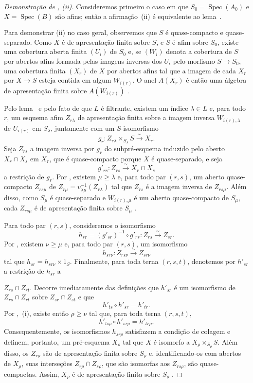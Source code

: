 \begin{proof}[Demonstração de , (ii)]
Consideremos primeiro o caso em que $S_0=\operatorname{Spec}(A_0)$ e $X=\operatorname{Spec}(B)$ são afins; então a afirmação~(ii) é equivalente ao lema~.

Para demonstrar (ii) no caso geral, observemos que $S$ é quase-compacto e quase-separado. Como $X$ é de apresentação finita sobre $S$, e $S$ é afim sobre $S_0$, existe uma cobertura aberta finita $(U_i)$ de $S_0$ e, se $(W_i)$ denota a cobertura de $S$ por abertos afins formada pelas imagens inversas dos $U_i$ pelo morfismo $S\to S_0$, uma cobertura finita $(X_r)$ de $X$ por abertos afins tal que a imagem de cada $X_r$ por $X\to S$ esteja contida em algum $W_{i(r)}$. O anel $A(X_r)$ é então uma álgebra de apresentação finita sobre $A(W_{i(r)})$ .

Pelo lema~ e pelo fato de que $L$ é filtrante, existem um índice $\lambda\in L$ e, para todo $r$, um esquema afim $Z_{r\lambda}$ de apresentação finita sobre a imagem inversa $W_{i(r),\lambda}$ de $U_{i(r)}$ em $S_\lambda$, juntamente com um $S$-isomorfismo
\[
 g_r:Z_{r\lambda}\times_{S_\lambda}S\xrightarrow{\sim}X_r.
\]
Seja $Z_{rs}$ a imagem inversa por $g_r$ do subpré-esquema induzido pelo aberto $X_r\cap X_s$ em $X_r$, que é quase-compacto porque $X$ é quase-separado, e seja
\[
 g'_{rs}:Z_{rs}\xrightarrow{\sim}X_r\cap X_s
\]
a restrição de $g_r$. Por , existem $\mu\geqslant\lambda$ e, para todo par $(r,s)$, um aberto quase-compacto $Z_{rs\mu}$ de $Z_{r\mu}=v_{\lambda\mu}^{-1}(Z_{r\lambda})$ tal que $Z_{rs}$ é a imagem inversa de $Z_{rs\mu}$. Além disso, como $S_\mu$ é quase-separado e $W_{i(r),\mu}$ é um aberto quase-compacto de $S_\mu$, cada $Z_{rs\mu}$ é de apresentação finita sobre $S_\mu$ .

Para todo par $(r,s)$, consideremos o isomorfismo
\[
 h_{sr}=(g'_{sr})^{-1}\circ g'_{rs}:Z_{rs}\xrightarrow{\sim}Z_{sr}.
\]
Por , existem $\nu\geqslant\mu$ e, para todo par $(r,s)$, um isomorfismo
\[
 h_{sr\nu}:Z_{rs\nu}\xrightarrow{\sim}Z_{sr\nu}
\]
tal que $h_{sr}=h_{sr\nu}\times 1_S$. Finalmente, para toda terna $(r,s,t)$, denotemos por $h'_{sr}$ a restrição de $h_{sr}$ a


$Z_{rs}\cap Z_{rt}$. Decorre imediatamente das definições que $h'_{sr}$ é um isomorfismo de $Z_{rs}\cap Z_{rt}$ sobre $Z_{sr}\cap Z_{st}$ e que
\[
 h'_{ts}\circ h'_{sr}=h'_{tr}.
\]
Por ,~(i), existe então $\rho\geqslant\nu$ tal que, para toda terna $(r,s,t)$,
\[
 h'_{ts\rho}\circ h'_{sr\rho}=h'_{tr\rho}.
\]
Consequentemente, os isomorfismos $h_{sr\rho}$ satisfazem a condição de colagem  e definem, portanto, um pré-esquema $X_\rho$ tal que $X$ é isomorfo a $X_\rho\times_{S_\rho}S$. Além disso, os $Z_{r\rho}$ são de apresentação finita sobre $S_\rho$ e, identificando-os com abertos de $X_\rho$, suas interseções $Z_{r\rho}\cap Z_{s\rho}$, que são isomorfas aos $Z_{rs\rho}$, são quase-compactas. Assim, $X_\rho$ é de apresentação finita sobre $S_\rho$ .
\end{proof}

